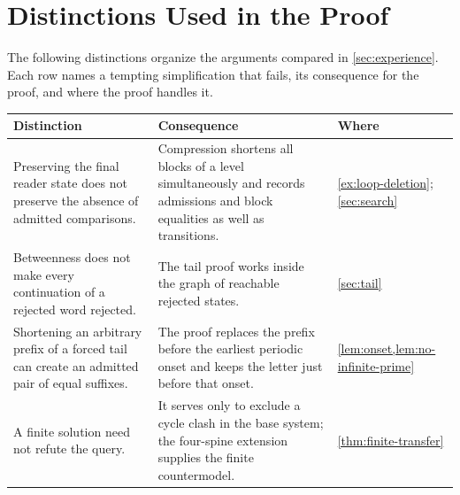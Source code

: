 \section{Distinctions Used in the Proof}
\label{app:history}

The following distinctions organize the arguments compared in
\cref{sec:experience}. Each row names a tempting simplification that fails,
its consequence for the proof, and where the proof handles it.
\begin{center}
\small
\begin{tabular}{@{}>{\raggedright\arraybackslash}p{.31\linewidth}>{\raggedright\arraybackslash}p{.40\linewidth}>{\raggedright\arraybackslash}p{.21\linewidth}@{}}
\toprule
Distinction & Consequence & Where\\
\midrule
Preserving the final reader state does not preserve the absence of
admitted comparisons. &
Compression shortens all blocks of a level simultaneously and records
admissions and block equalities as well as transitions. &
\cref{ex:loop-deletion}; \cref{sec:search}\\
\addlinespace
Betweenness does not make every continuation of a rejected word rejected. &
The tail proof works inside the graph of reachable rejected states. &
\cref{sec:tail}\\
\addlinespace
Shortening an arbitrary prefix of a forced tail can create an admitted pair
of equal suffixes. &
The proof replaces the prefix before the earliest periodic onset and keeps
the letter just before that onset. &
\cref{lem:onset,lem:no-infinite-prime}\\
\addlinespace
A finite solution need not refute the query. &
It serves only to exclude a cycle clash in the base system; the four-spine
extension supplies the finite countermodel. &
\cref{thm:finite-transfer}\\
\bottomrule
\end{tabular}
\end{center}
